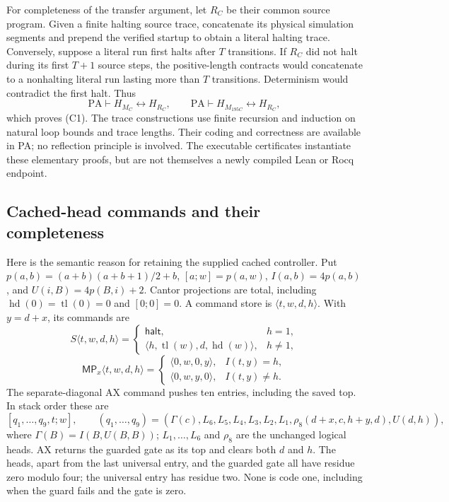 For completeness of the transfer argument, let $R_C$ be their common
source program. Given a finite halting source trace, concatenate its
physical simulation segments and prepend the verified startup to obtain
a literal halting trace. Conversely, suppose a literal run first halts
after $T$ transitions. If $R_C$ did not halt during its first $T+1$ source
steps, the positive-length contracts would concatenate to a nonhalting
literal run lasting more than $T$ transitions. Determinism would contradict
the first halt. Thus
\[
 \mathrm{PA}\vdash H_{M_C}\leftrightarrow H_{R_C},\qquad
 \mathrm{PA}\vdash H_{M_{195C}}\leftrightarrow H_{R_C},
\]
which proves (C1). The trace constructions use finite recursion and
induction on natural loop bounds and trace lengths. Their coding and
correctness are available in PA; no reflection principle is involved.
The executable certificates instantiate these elementary proofs, but are
not themselves a newly compiled Lean or Rocq endpoint.

\subsection{Cached-head commands and their completeness}

Here is the semantic reason for retaining the supplied cached controller.
Put $p(a,b)=(a+b)(a+b+1)/2+b$, $[a;w]=p(a,w)$,
$I(a,b)=4p(a,b)$, and $U(i,B)=4p(B,i)+2$. Cantor projections are total,
including $\operatorname{hd}(0)=\operatorname{tl}(0)=0$ and $[0;0]=0$.
A command store is $\langle t,w,d,h\rangle$. With $y=d+x$, its commands
are
\[
 S\langle t,w,d,h\rangle=
 \begin{cases}
 \mathsf{halt},&h=1,\\
 \langle h,\operatorname{tl}(w),d,\operatorname{hd}(w)\rangle,&h\ne1,
 \end{cases}
\]
\[
 \mathsf{MP}_x\langle t,w,d,h\rangle=
 \begin{cases}
 \langle0,w,0,y\rangle,&I(t,y)=h,\\
 \langle0,w,y,0\rangle,&I(t,y)\ne h.
 \end{cases}
\]
The separate-diagonal AX command pushes ten entries, including the saved
top. In stack order these are
\[
 [q_1,\ldots,q_9,t;w],\qquad
 (q_1,\ldots,q_9)=(\Gamma(c),L_6,L_5,L_4,L_3,L_2,L_1,
                    \rho_8(d+x,c,h+y,d),U(d,h)),
\]
where $\Gamma(B)=I(B,U(B,B))$; $L_1,\ldots,L_6$ and $\rho_8$ are
the unchanged logical heads. AX returns the guarded gate as its top and
clears both $d$ and $h$. The heads, apart from the last universal entry,
and the guarded gate all have residue zero modulo four; the universal
entry has residue two. None is code one, including when the guard fails
and the gate is zero.


